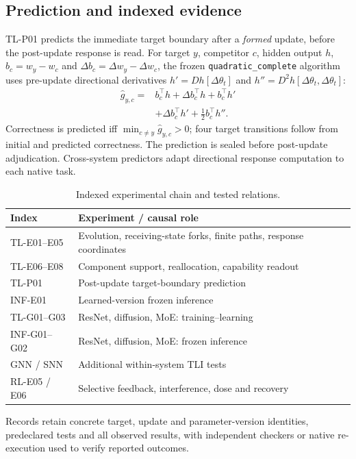 \documentclass{article}
\begin{document}
\subsection{Prediction and indexed evidence}
TL-P01 predicts the immediate target boundary after a \emph{formed} update, before the post-update response is read. For target $y$, competitor $c$, hidden output $h$, $b_c=w_y-w_c$ and $\Delta b_c=\Delta w_y-\Delta w_c$, the frozen \texttt{quadratic\_complete} algorithm uses pre-update directional derivatives $h'=Dh[\Delta\theta_t]$ and $h''=D^2h[\Delta\theta_t,\Delta\theta_t]$:
\begin{equation}
 \begin{aligned}
 \widehat g_{y,c}={}&b_c^\top h+\Delta b_c^\top h+b_c^\top h'\\
 &+\Delta b_c^\top h'+\tfrac12 b_c^\top h''.
 \end{aligned}
 \label{eq:predict}
\end{equation}
Correctness is predicted iff $\min_{c\ne y}\widehat g_{y,c}>0$; four target transitions follow from initial and predicted correctness. The prediction is sealed before post-update adjudication. Cross-system predictors adapt directional response computation to each native task.

\begin{table}[t]
\centering\small\setlength{\tabcolsep}{3pt}\renewcommand{\arraystretch}{1.09}
\begin{tabular}{@{}p{}p{}@{}}\toprule
Index & Experiment / causal role\\\midrule
TL-E01--E05 & Evolution, receiving-state forks, finite paths, response coordinates\\
TL-E06--E08 & Component support, reallocation, capability readout\\
TL-P01 & Post-update target-boundary prediction\\
INF-E01 & Learned-version frozen inference\\
TL-G01--G03 & ResNet, diffusion, MoE: training--learning\\
INF-G01--G02 & ResNet, diffusion, MoE: frozen inference\\
GNN / SNN & Additional within-system TLI tests\\
RL-E05 / E06 & Selective feedback, interference, dose and recovery\\
\bottomrule\end{tabular}
\caption{Indexed experimental chain and tested relations.}
\label{tab:index}\end{table}
Records retain concrete target, update and parameter-version identities, predeclared tests and all observed results, with independent checkers or native re-execution used to verify reported outcomes.
\end{document}

